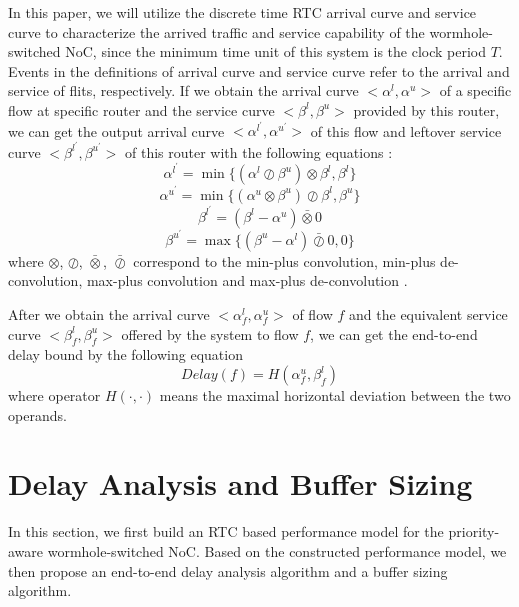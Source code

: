 \documentclass[preprint]{elsarticle}
\begin{document}
In this paper, we will utilize the discrete time RTC arrival curve and service curve to characterize the arrived traffic and service capability of the wormhole-switched NoC, since the minimum time unit of this system is the clock period $T$. Events in the definitions of arrival curve and service curve refer to the arrival and service of flits, respectively. If we obtain the arrival curve $<\alpha^l,\alpha^u>$ of a specific flow at specific router and the service curve $<\beta^l,\beta^u>$ provided by this router, we can get the output arrival curve $<\alpha^{l^\prime},\alpha^{u^\prime}>$ of this flow and leftover service curve $<\beta^{l^\prime},\beta^{u^\prime}>$ of this router with the following equations \cite{1253607}:
\begin{equation}\label{alphal}
\alpha^{l^\prime}=\min\{(\alpha^l\oslash\beta^u)\otimes\beta^l,\beta^l\}
\end{equation}
\begin{equation}\label{alphau}
\alpha^{u^\prime}=\min\{(\alpha^u\otimes\beta^u)\oslash\beta^l,\beta^u\}
\end{equation}
\begin{equation}\label{betal}
\beta^{l^\prime}=(\beta^l-\alpha^u)\bar{\otimes}0
\end{equation}
\begin{equation}\label{betau}
\beta^{u^\prime}=\max\{(\beta^u-\alpha^l)\bar{\oslash}0,0\}
\end{equation}
where $\otimes$, $\oslash$, $\bar{\otimes}$, $\bar{\oslash}$ correspond to the min-plus convolution, min-plus de-convolution, max-plus convolution and max-plus de-convolution \cite{Boudec2001Network}.

After we obtain the arrival curve $<\alpha^l_{f},\alpha^u_{f}>$ of flow $f$ and the equivalent service curve $<\beta_{f}^l,\beta_{f}^u>$ offered by the system to flow $f$, we can get the end-to-end delay bound by the following equation \cite{Boudec2001Network}
\begin{equation}\label{delay}
Delay(f)=H(\alpha^u_{f},\beta^l_{f})
\end{equation}
where operator $H(\cdot,\cdot)$ means the maximal horizontal deviation between the two operands.

\section{Delay Analysis and Buffer Sizing}\label{modeling}
In this section, we first build an RTC based performance model for the priority-aware wormhole-switched NoC. Based on the constructed performance model, we then propose an end-to-end delay analysis algorithm and a buffer sizing algorithm.
\end{document}
